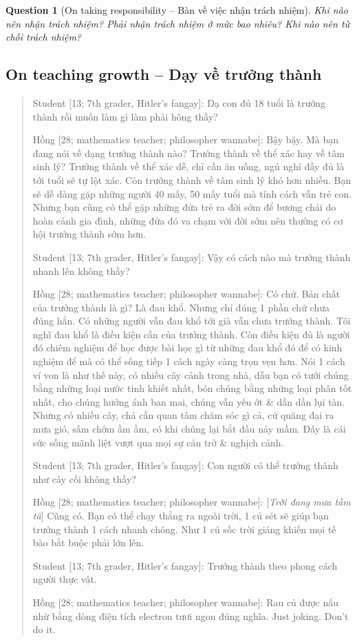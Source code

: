 \documentclass[12pt]{article}
\newtheorem{question}{Question}
\begin{document}
\begin{question}[On taking responsibility -- Bàn về việc nhận trách nhiệm]
	Khi nào nên nhận trách nhiệm? Phải nhận trách nhiệm ở mức bao nhiêu? Khi nào nên từ chối trách nhiệm?
\end{question}

\subsection{On teaching growth -- Dạy về trưởng thành}

\begin{quotation}
	{\sf Student [13; 7th grader, Hitler's fangay]}: Dạ con đủ 18 tuổi là trưởng thành rồi muốn làm gì làm phải hông thầy?
	
	{\sf Hồng [28; mathematics teacher; philosopher wannabe]}: Bậy bậy. Mà bạn đang nói về dạng trưởng thành nào? Trưởng thành về thể xác hay về tâm sinh lý? Trưởng thành về thể xác dễ, chỉ cần ăn uống, ngủ nghỉ đầy đủ là tới tuổi sẽ tự lột xác. Còn trưởng thành về tâm sinh lý khó hơn nhiều. Bạn sẽ dễ dàng gặp những người 40 mấy, 50 mấy tuổi mà tính cách vẫn trẻ con. Nhưng bạn cũng có thể gặp những đứa trẻ ra đời sớm để bương chải do hoàn cảnh gia đình, những đứa đó va chạm với đời sớm nên thường có cơ hội trưởng thành sớm hơn.
	
	{\sf Student [13; 7th grader, Hitler's fangay]}: Vậy có cách nào mà trưởng thành nhanh lên không thầy?
	
	{\sf Hồng [28; mathematics teacher; philosopher wannabe]}: Có chứ. Bản chất của trưởng thành là gì? Là đau khổ. Nhưng chỉ đúng 1 phần chứ chưa đúng hẳn. Có những người vẫn đau khổ tới già vẫn chưa trưởng thành. Tôi nghĩ đau khổ là điều kiện cần của trưởng thành. Còn điều kiện đủ là người đó chiêm nghiệm để học được bài học gì từ những đau khổ đó để có kinh nghiệm để mà có thể sống tiếp 1 cách ngày càng trọn vẹn hơn. Nói 1 cách ví von là như thế này, có nhiều cây cảnh trong nhà, dẫu bạn có tưới chúng bằng những loại nước tinh khiết nhất, bón chúng bằng những loại phân tốt nhất, cho chúng hưởng ánh ban mai, chúng vẫn yếu ớt \& dần dần lụi tàn. Nhưng có nhiều cây, chả cần quan tâm chăm sóc gì cả, cứ quăng đại ra mưa gió, sấm chớm ầm ầm, có khi chúng lại bắt đầu nảy mầm. Đấy là cái sức sống mãnh liệt vượt qua mọi sự cản trở \& nghịch cảnh. 
	
	{\sf Student [13; 7th grader, Hitler's fangay]}: Con người có thể trưởng thành như cây cối không thầy?
	
	{\sf Hồng [28; mathematics teacher; philosopher wannabe]}: [{\it Trời đang mưa tầm tã}] Cũng có. Bạn có thể chạy thẳng ra ngoài trời, 1 cú sét sẽ giúp bạn trưởng thành 1 cách nhanh chóng. Như 1 cú sốc trời giáng khiến mọi tế bào bắt buộc phải lớn lên.
	
	{\sf Student [13; 7th grader, Hitler's fangay]}: Trưởng thành theo phong cách người thực vật.
	
	{\sf Hồng [28; mathematics teacher; philosopher wannabe]}: Rau củ được nấu nhừ bằng dòng điện tích electron tươi ngon đúng nghĩa. Just joking. Don't do it.
\end{quotation}
\end{document}
